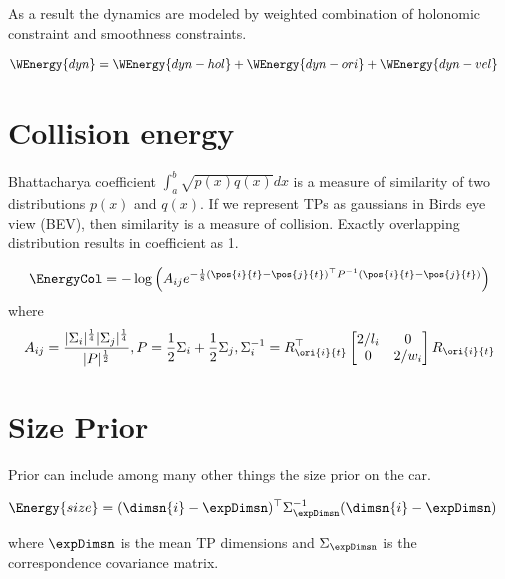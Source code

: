 As a result the dynamics are modeled by weighted combination of holonomic
constraint and smoothness constraints.

\begin{align}
  \WEnergy{dyn} &= \WEnergy{dyn-hol} + \WEnergy{dyn-ori} + \WEnergy{dyn-vel}
\end{align}

 
\section{Collision energy}

Bhattacharya coefficient $\int_a^b\sqrt{p(x)q(x)}dx$ is a measure of similarity
of two distributions $p(x)$ and $q(x)$. If we represent TPs as gaussians in
Birds eye view (BEV), then similarity is a measure of collision. Exactly
overlapping distribution results in coefficient as 1. 

\begin{align}
  \label{eq:collisionEnergyHellingerDistance}
  \EnergyCol =
  -\log\left(
  A_{ij}
  e^{-\frac{1}{8}
    \left(\pos{i}{t} - \pos{j}{t}\right)^\top
    P^{-1}
    \left(\pos{i}{t} - \pos{j}{t}\right)
    }
    \right)
\end{align}
where 
\begin{multline}
  A_{ij} = \frac{|\Sigma_i|^\frac{1}{4}|\Sigma_j|^\frac{1}{4}}{|P|^\frac{1}{2}}, \hfill
  P = \frac{1}{2}\Sigma_i + \frac{1}{2}\Sigma_j, \hfill
\Sigma_i^{-1} = R^\top_{\ori{i}{t}} \begin{bmatrix} 2/l_i & 0 \\ 0 & 2/w_i \end{bmatrix}
R_{\ori{i}{t}}
\end{multline}


\section{Size Prior}

Prior can include among many other things the size prior on the car.

\begin{align}
  \label{eq:totalSizeEnergy}
  \Energy{size} &= (\dimsn{i} - \expDimsn)^\top\Sigma_{\expDimsn}^{-1}(\dimsn{i} -
  \expDimsn)
\end{align}

where $\expDimsn$ is the mean TP dimensions and
$\Sigma_{\expDimsn}$ is the correspondence covariance matrix.
